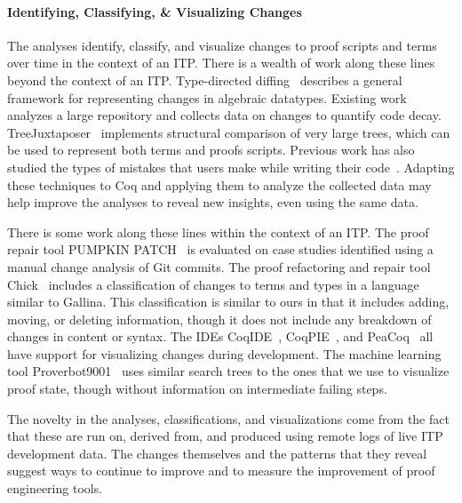 \paragraph{Identifying, Classifying, \& Visualizing Changes}

The \toolname analyses identify, classify, and visualize changes to proof
scripts and terms over time in the context of an ITP.
There is a wealth of work along these lines beyond the context of an ITP.
Type-directed diffing~\cite{Miraldo2017}
describes a general framework
for representing changes in algebraic datatypes.
Existing work~\cite{code-decay} analyzes a large repository and collects 
data on changes to quantify code decay.
TreeJuxtaposer~\cite{tree-comparison} implements structural comparison of
very large trees, which can be used to represent both terms and proofs
scripts. 
Previous work has also studied the types of mistakes that users make
while writing their code~\cite{causes-of-error}.
Adapting these techniques to Coq and applying them to analyze
the collected data may help improve the \toolname analyses to reveal
new insights, even using the same data.

There is some work along these lines within the context of an ITP.
The proof repair tool \textsc{PUMPKIN PATCH}~\cite{Ringer2018} 
is evaluated on case studies identified using a manual change analysis of 
Git commits.
The proof refactoring and repair tool Chick~\cite{robert2018} includes 
a classification of changes to terms and types in a language similar to Gallina.
This classification is similar to ours in that it includes adding, moving,
or deleting information, though it does not include any breakdown of
changes in content or syntax.
The IDEs CoqIDE~\cite{proof-diff}, CoqPIE~\cite{Roe2016},
and PeaCoq~\cite{peacoq} all have support for visualizing changes
during development. 
The machine learning tool Proverbot9001~\cite{proverbot9001}
uses similar search trees to the ones that we use to visualize proof state,
though without information on intermediate failing steps.

The novelty in the \toolname analyses, classifications, and visualizations
come from the fact that these are run on, derived from, and produced using
remote logs of live ITP development data.
The changes themselves and the patterns that they reveal suggest
ways to continue to improve and to measure the improvement of
proof engineering tools.


\iffalse
These include degree-of-interest trees,~\cite{degree-of-interest}
fish-eye views,~\cite{fish-eye} and menus.~\cite{menus}
\fi

